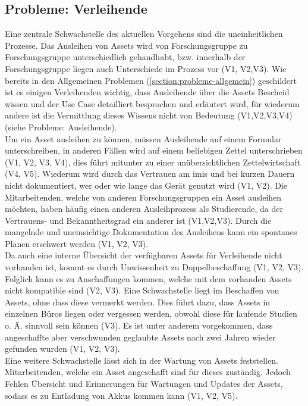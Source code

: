 \subsection{Probleme: Verleihende}
Eine zentrale Schwachstelle des aktuellen Vorgehens sind die uneinheitlichen Prozesse. Das Ausleihen
von Assets wird von Forschungsgruppe zu Forschungsgruppe unterschiedlich gehandhabt, bzw. innerhalb
der Forschungsgruppe liegen auch Unterschiede im Prozess vor (V1, V2,V3). Wie bereits in den
Allgemeinen Problemen (\ref{section:probleme-allgemein}) geschildert ist es einigen Verleihenden
wichtig, dass Ausleihende über die Assets Bescheid wissen und der Use Case detailliert besprochen
und erläutert wird, für wiederum andere ist die Vermittlung dieses Wissens nicht von Bedeutung
(V1,V2,V3,V4) (siehe Probleme: Ausleihende).\\
Um ein Asset ausleihen zu können, müssen Ausleihende auf einem Formular unterschreiben, in anderen
Fällen wird auf einem beliebigen Zettel unterschrieben (V1, V2, V3, V4), dies führt mitunter zu einer
unübersichtlichen Zettelwirtschaft (V4, V5). Wiederum wird durch das Vertrauen am \ac{imis} und bei
kurzen Dauern nicht dokumentiert, wer oder wie lange das Gerät genutzt wird (V1, V2). Die
Mitarbeitenden, welche von anderen Forschungsgruppen ein Asset ausleihen möchten, haben häufig einen
anderen Ausleihprozess als Studierende, da der Vertrauens- und Bekanntheitsgrad ein anderer ist
(V1,V2,V3). Durch die mangelnde und uneinsichtige Dokumentation des Ausleihens kann ein spontanes
Planen erschwert werden (V1, V2, V3).\\
Da auch eine interne Übersicht der verfügbaren Assets für Verleihende nicht vorhanden ist, kommt es
durch Unwissenheit zu Doppelbeschaffung (V1, V2, V3). Folglich kann es zu Anschaffungen kommen,
welche mit dem vorhanden Assets nicht kompatible sind (V2, V3). Eine Schwachstelle liegt im
Beschaffen von Assets, ohne dass diese vermerkt werden. Dies führt dazu, dass Assets in einzelnen
Büros liegen oder vergessen werden, obwohl diese für laufende Studien o. Ä. sinnvoll sein können
(V3). Es ist unter anderem vorgekommen, dass angeschaffte aber verschwunden geglaubte Assets nach
zwei Jahren wieder gefunden wurden (V1, V2, V3).\\
Eine weitere Schwachstelle lässt sich in der Wartung von Assets feststellen. Mitarbeitenden, welche
ein Asset angeschafft sind für dieses zuständig. Jedoch Fehlen Übersicht und Erinnerungen für
Wartungen und Updates der Assets, sodass es zu Entladung von Akkus kommen kann (V1, V2, V5).

